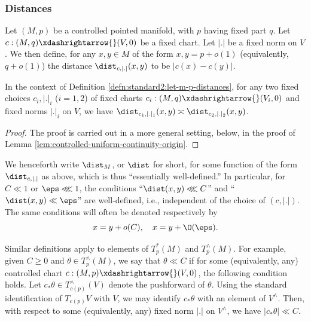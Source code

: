 \subsubsection{Distances}\label{sec:distances}
\begin{definition}\label{defn:standard2:let-m-p-distances}
  Let $(M,p)$ be a controlled pointed manifold, with $p$ having fixed part $q$.  Let $c : (M,q) \xdashrightarrow{} (V,0)$ be a fixed chart.  Let $|.|$ be a fixed norm on $V$.  We then define, for any $x,y \in M$ of the form $x,y = p + o(1)$ (equivalently, $q + o(1)$) the distance $\dist_{c,|.|}(x,y)$ to be $|c(x) - c(y)|$.
\end{definition}
\begin{lemma}
  In the context of Definition \ref{defn:standard2:let-m-p-distances}, for any two fixed choices $c_i, |.|_i$ ($i=1,2$) of fixed charts $c_i : (M, q) \xdashrightarrow{} (V_i,0)$ and fixed norms $|.|_i$ on $V$, we have $\dist_{c_1,|.|_1}(x,y) \asymp \dist_{c_2,|.|_2}(x,y)$.
\end{lemma}
\begin{proof}
  The proof is carried out in a more general setting, below, in the proof of Lemma \ref{lem:controlled-uniform-continuity-origin}.
\end{proof}

We henceforth write $\dist_M$, or $\dist$ for short, for some function of the form $\dist_{c,|.|}$ as above, which is thus ``essentially well-defined.''  In particular, for $C \ll 1$ or $\eps \lll 1$, the conditions ``$\dist(x,y) \lll C$'' and ``$\dist(x,y) \ll \eps$'' are well-defined, i.e., independent of the choice of $(c,|.|)$.  The same conditions will often be denoted respectively by
\begin{equation*}
  x = y + o(C), \quad x = y + \O(\eps).
\end{equation*}

Similar definitions apply to elements of $T_p^*(M)$ and $T_p^\wedge(M)$.  For example, given $C \geq 0$ and $\theta \in T_p^\wedge(M)$, we say that $\theta \ll C$ if for some (equivalently, any) controlled chart $c : (M,p) \xdashrightarrow{} (V,0)$, the following condition holds.  Let $c_* \theta \in T_{c(p)}^\wedge(V)$ denote the pushforward of $\theta$.  Using the standard identification of $T_{c(p)} V$ with $V$, we may identify $c_* \theta$ with an element of $V^\wedge$.  Then, with respect to some (equivalently, any) fixed norm $|.|$ on $V^\wedge$, we have $|c_* \theta| \ll C$.

